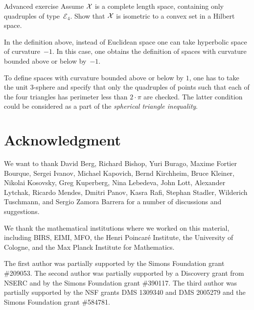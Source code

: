 \begin{thm}{Advanced exercise}\label{ex:convex-set}
Assume $\mathcal{X}$ is a complete length space, containing only quadruples of type~$\mathcal{E}_4$.
Show that $\mathcal{X}$ is isometric to a convex set in a Hilbert space.
\end{thm}

In the definition above, 
instead of  Euclidean space 
one can take  
hyperbolic space of curvature~$-1$.
In this case,
one obtains the definition of spaces with curvature bounded above or below by~$-1$.

To define spaces with curvature bounded above or below by $1$,
one has to take the unit 3-sphere 
and specify that only the quadruples of points such that each of the four triangles has perimeter 
less than $2\cdot\pi$ are checked.
The latter condition could be considered as a part of the {}\emph{spherical triangle inequality}.


{\sloppy

\section*{Acknowledgment}
We want to  thank 
David Berg,
Richard Bishop,
Yuri Burago,
Maxime Fortier Bourque,
Sergei Ivanov,
Michael Kapovich, 
Bernd Kirchheim, 
Bruce Kleiner,
Nikolai Kosovsky,
Greg Kuperberg,
Nina Lebedeva,
John Lott,
Alexander Lytchak,
Ricardo Mendes,
Dmitri Panov,
Kasra Rafi,
Stephan Stadler,
Wilderich Tuschmann,
and 
Sergio Zamora Barrera
for a number of discussions and suggestions.

}

We thank the mathematical institutions where we worked on this material, including
BIRS, 
EIMI,
MFO, 
the Henri Poincar\'{e} Institute,
the University of Cologne, and
the Max Planck Institute for Mathematics.

The first author was partially supported by  the Simons Foundation grant \#209053.
The second author was partially supported by a Discovery grant from NSERC and by the Simons Foundation grant \#390117.
The third author was partially supported by the
NSF grants DMS 1309340 and DMS 2005279
and the Simons Foundation grant \#584781.

